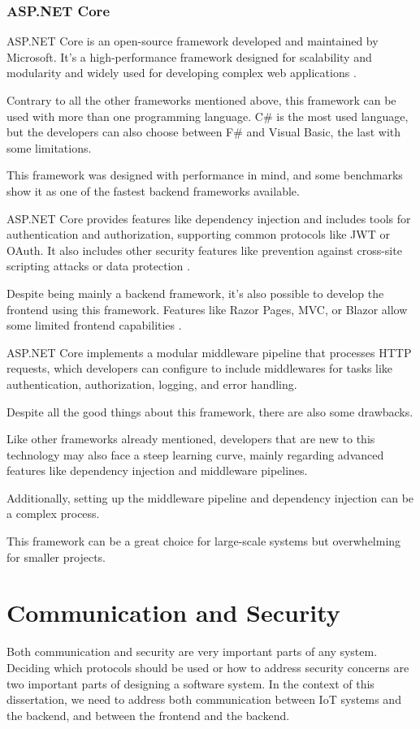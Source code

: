 \subsubsection{ASP.NET Core}
ASP.NET Core is an open-source framework developed and maintained by Microsoft.
It's a high-performance framework designed for scalability and modularity and
widely used for developing complex web applications \cite{ASPMicrosoft}.

Contrary to all the other frameworks mentioned above, this framework can be
used with more than one programming language. C\# is the most used language, but
the developers can also choose between F\# and Visual Basic, the last with some
limitations.

This framework was designed with performance in mind, and some benchmarks show
it as one of the fastest backend frameworks available.

ASP.NET Core provides features like dependency injection and includes tools for
authentication and authorization, supporting common protocols like \gls{JWT} or OAuth.
It also includes other security features like prevention against cross-site
scripting attacks or data protection \cite{ASPMicrosoft}.

Despite being mainly a backend framework, it's also possible to develop the
frontend using this framework. Features like Razor Pages, \gls{MVC}, or Blazor allow
some limited frontend capabilities \cite{ASPMicrosoft}.

ASP.NET Core implements a modular middleware pipeline that processes \gls{HTTP}
requests, which developers can configure to include middlewares for tasks like
authentication, authorization, logging, and error handling.

Despite all the good things about this framework, there are also some drawbacks.

Like other frameworks already mentioned, developers that are new to this
technology may also face a steep learning curve, mainly regarding advanced
features like dependency injection and middleware pipelines.

Additionally, setting up the middleware pipeline and dependency injection can be a complex
process.

This framework can be a great choice for large-scale systems but overwhelming
for smaller projects.

\section{Communication and Security}
Both communication and security are very important parts of any system.
Deciding which protocols should be used or how to address security concerns are two
important parts of designing a software system. In the context of this
dissertation, we need to address both communication between \gls{IoT} systems and
the backend, and between the frontend and the backend.


